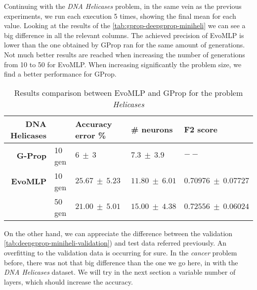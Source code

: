 \documentclass[runningheads]{llncs}
\begin{document}
Continuing with the \emph{DNA Helicases} \cite{dna-helicases} problem, in the
same vein as the previous experiments, we run each execution 5 times, showing
the final mean for each value. Looking at the results of the
\autoref{tab:gprop-deepgprop-miniheli} we can see a big difference in all the
relevant columns. The achieved precision of {\sf EvoMLP} is lower than the one
obtained by GProp ran for the same amount of generations. Not much better
results are reached when increasing the number of generations from 10 to 50 for
{\sf EvoMLP}. When increasing significantly the problem size, we find a better
performance for GProp.

\begin{table}
    \centering
    \caption{
        Results comparison between {\sf EvoMLP} and GProp for the problem \emph{Helicases}
    }
    \label{tab:gprop-deepgprop-miniheli}
    \begin{tabular}{rllll}
        \textbf{DNA Helicases} &    & \textbf{Accuracy error \%} & \textbf{\# neurons}     & \textbf{F2 score}\\
        \hline
        \textbf{G-Prop}    & 10 gen & $6\ \pm\ 3$            & $7.3\ \pm\ 3.9$     & $--$                    \\
        \textbf{{\sf EvoMLP}} & 10 gen & $25.67\ \pm\ 5.23$     & $11.80\ \pm\ 6.01$  & $0.70976\ \pm\ 0.07727$ \\
                       & 50 gen & $21.00\ \pm\ 5.01$     & $15.00\ \pm\ 4.38$  & $0.72556\ \pm\ 0.06024$ \\
    \end{tabular}
\end{table}


On the other hand, we can appreciate the difference between the validation
\autoref{tab:deepgprop-miniheli-validation}) and test data referred previously.
An overfitting to the validation data is occurring for sure. In the
\emph{cancer} problem before, there was not that big difference than the one we
go here, in with the \emph{DNA Helicases} dataset. We will try in the next
section a variable number of layers, which should increase the
accuracy. %
\end{document}
